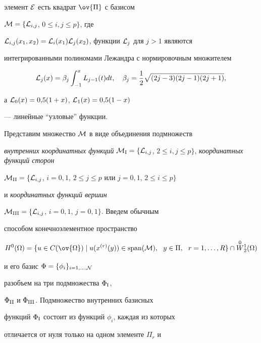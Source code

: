 элемент $\cal E$ есть квадрат $\ov{\Pi}$ с базисом 


${\cal M}=\{ {\cal L}_{i,j}$, $0\leq i,j\leq p\}$, где


${\cal L}_{i,j}(x_1,x_2)={\cal L}_i(x_1) {\cal


L}_j(x_2)$, функции ${\cal L}_j$ для $j>1$ являются


интегрированными полиномами Лежандра с нормировочным множителем


$$ 


{\cal L}_j(x)=\beta_j \int_{-1}^x L_{j-1}(t)dt,\quad


\beta_j=\frac{1}{2}\sqrt{(2j-3)(2j-1)(2j+1)},


$$


а ${\cal L}_0(x)=0{,}5(1+x)$, ${\cal L}_1(x)=0{,}5(1-x)$


--- линейные ``узловые'' функции.





Представим множество ${\cal M}$ в виде объединения подмножеств 


{\em внутренних координатных функций} ${\cal M}_\ri = \{ {\cal


L}_{i,j}$, $2\leq i,j\leq p\}$, {\em координатных функций сторон} 


${\cal M}_\rii= \{ {\cal 


L}_{i,j}$, $i=0,1$, $2\le j\le p$ или $j=0,1$, $2\le i\le p \}$


и {\em координатных функций вершин} 


${\cal M}_{\mathrm{III}}=\{ {\cal L}_{i,j}$, $i=0,1$, $j=0,1 \}$. Введем обычным


способом конечноэлементное пространство


$$ 


H^0(\Omega)=\{ u\in C(\ov{\Omega})\mid u(x^{(r)}(y))\in


\Span({\cal M}), \ \ y\in \Pi, \ \ r=1,\dotsc, R


\} \cap \W


$$ 


и его базис $\Phi=\{ \phi_i \}_{i=1,\dotsc, {\cal N}}$ 


разобъем на три подмножества $\Phi_{\mathrm{I}}$,


$\Phi_{\mathrm{II}}$ и $\Phi_{\mathrm{III}}$. Подмножество внутренних базисных 


функций $\Phi_{\mathrm{I}}$ состоит из функций $\phi_i$, каждая из которых 


отличается от нуля только на одном элементе $\Pi_r$ и


